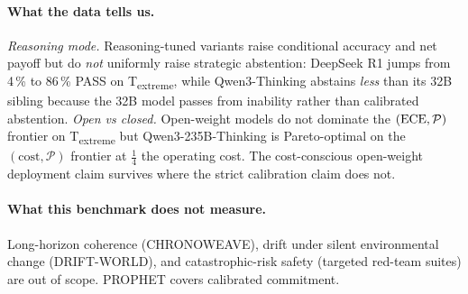 \paragraph{What the data tells us.}
\emph{Reasoning mode.} Reasoning-tuned variants raise conditional
accuracy and net payoff but do \emph{not} uniformly raise strategic
abstention: DeepSeek R1 jumps from 4\,\% to 86\,\% PASS on
T\textsubscript{extreme}, while Qwen3-Thinking abstains \emph{less}
than its 32B sibling because the 32B model passes from inability
rather than calibrated abstention.
\emph{Open vs closed.} Open-weight models do not dominate the
$(\mathrm{ECE}, \mathcal{P})$ frontier on T\textsubscript{extreme} but
Qwen3-235B-Thinking is Pareto-optimal on the $(\text{cost},
\mathcal{P})$ frontier at $\frac{1}{4}$ the operating cost. The
cost-conscious open-weight deployment claim survives where the strict
calibration claim does not.

\paragraph{What this benchmark does not measure.}
Long-horizon coherence (CHRONOWEAVE), drift under silent environmental
change (DRIFT-WORLD), and catastrophic-risk safety (targeted red-team
suites) are out of scope. PROPHET covers calibrated commitment.
